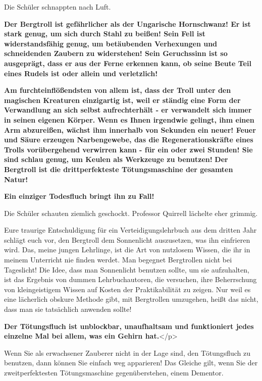 Die Schüler schnappten nach Luft.

\textbf{\glqq Der Bergtroll ist gefährlicher als der Ungarische Hornschwanz! Er
ist stark genug, um sich durch Stahl zu beißen! Sein Fell ist widerstandsfähig
genug, um betäubenden Verhexungen und schneidenden Zaubern zu widerstehen! Sein
Geruchssinn ist so ausgeprägt, dass er aus der Ferne erkennen kann, ob seine
Beute Teil eines Rudels ist oder allein und verletzlich!}

\textbf{Am furchteinflößendsten von allem ist, dass der Troll unter den
magischen Kreaturen einzigartig ist, weil er ständig eine Form der Verwandlung
an sich selbst aufrechterhält - er verwandelt sich immer in seinen eigenen
Körper.} \textbf{Wenn es Ihnen irgendwie gelingt, ihm einen Arm abzureißen,
wächst ihm innerhalb von Sekunden ein neuer! Feuer und Säure erzeugen
Narbengewebe, das die Regenerationskräfte eines Trolls vorübergehend verwirren
kann - für ein oder zwei Stunden! Sie sind schlau genug, um Keulen als Werkzeuge
zu benutzen! } \textbf{Der Bergtroll ist die drittperfekteste Tötungsmaschine
der gesamten Natur!}

\textbf{Ein einziger Todesfluch bringt ihn zu Fall!}\grqq{}

Die Schüler schauten ziemlich geschockt. Professor Quirrell lächelte eher
grimmig.

\glqq Eure traurige Entschuldigung für ein Verteidigungslehrbuch aus dem dritten
Jahr schlägt euch vor, den Bergtroll dem Sonnenlicht auszusetzen, was ihn
einfrieren wird. Das, meine jungen Lehrlinge, ist die Art von nutzlosem Wissen,
die ihr in meinem Unterricht nie finden werdet. Man begegnet Bergtrollen nicht
bei Tageslicht! Die Idee, dass man Sonnenlicht benutzen sollte, um sie
aufzuhalten, ist das Ergebnis von dummen Lehrbuchautoren, die versuchen, ihre
Beherrschung von kleingeistigem Wissen auf Kosten der Praktikabilität zu zeigen.
Nur weil es eine lächerlich obskure Methode gibt, mit Bergtrollen umzugehen,
heißt das nicht, dass man sie tatsächlich anwenden sollte!

\textbf{Der Tötungsfluch ist unblockbar, unaufhaltsam und funktioniert jedes
einzelne Mal bei allem, was ein Gehirn hat.}</p>

Wenn Sie als erwachsener Zauberer nicht in der Lage sind, den Tötungsfluch zu
benutzen, dann können Sie einfach weg apparieren! Das Gleiche gilt, wenn Sie der
zweitperfektesten Tötungsmaschine gegenüberstehen, einem Dementor.

